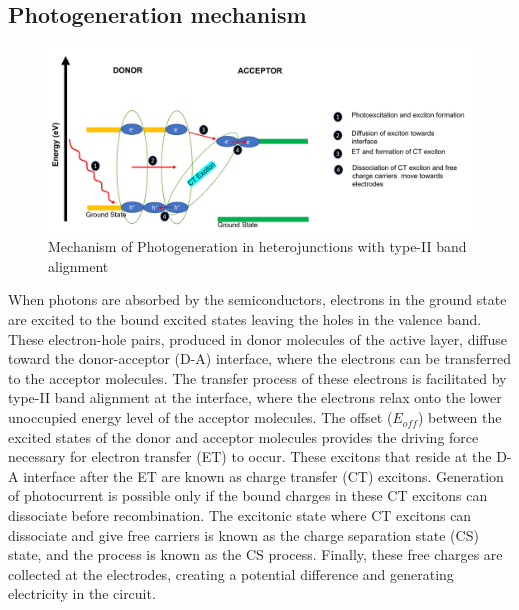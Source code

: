 \documentclass[12pt]{article}
\begin{document}
\subsection{Photogeneration mechanism}
\begin{figure}[H]
    \centering
    \includegraphics[scale = 0.6]{mechanism-CT.png}
    \caption{Mechanism of Photogeneration in heterojunctions with type-II band alignment}
    \label{fig:my_label}
\end{figure}
When photons are absorbed by the semiconductors, electrons in the ground state are excited to the bound excited states leaving the holes in the valence band. These electron-hole pairs, produced in donor molecules of the active layer, diffuse toward the donor-acceptor (D-A) interface, where the electrons can be transferred to the acceptor molecules. The transfer process of these electrons is facilitated by type-II band alignment at the interface, where the electrons relax onto the lower unoccupied energy level of the acceptor molecules. The offset ($E_{off}$) between the excited states of the donor and acceptor molecules provides the driving force necessary for electron transfer (ET) to occur. These excitons that reside at the D-A interface after the ET are known as charge transfer (CT) excitons. Generation of photocurrent is possible only if the bound charges in these CT excitons can dissociate before recombination. The excitonic state where CT excitons can dissociate and give free carriers is known as the charge separation state (CS) state, and the process is known as the CS process. Finally, these free charges are collected at the electrodes, creating a potential difference and generating electricity in the circuit.
\end{document}
